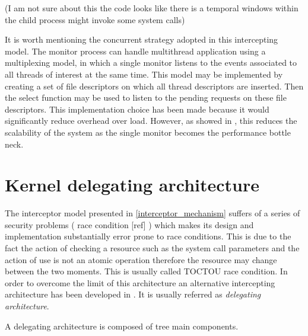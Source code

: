 (I am not sure about this the code looks like there is a temporal windows within the child process might invoke some system calls) 

It is worth mentioning the concurrent strategy adopted in this intercepting model. The monitor process can handle multithread application using a multiplexing model, in which a single monitor listens to the events associated to all threads of interest at the same time. This model may be implemented by creating a set of file descriptors on which all thread descriptors are inserted. Then the select function may be used to listen to the pending requests on these file descriptors.  This implementation choice has been made because it would  significantly reduce overhead over load. However, as showed in \cite{Garfinkel03ostia:a}, this reduces the scalability of the system as the single monitor becomes the performance bottle neck.  


\section{Kernel delegating  architecture}

The interceptor model presented in \ref{interceptor_mechanism} suffers of a series of security problems ( race condition [ref] ) which makes its design and implementation substantially error prone to race conditions. This is due to the fact the action of checking a resource such as the system call parameters and the action of use is not an atomic operation therefore the resource may change between the two moments. This is usually called TOCTOU race condition.  In order to overcome the limit of this architecture an alternative  intercepting architecture has been developed  in \cite{Garfinkel03ostia:a}. It is usually referred as \textit{delegating architecture}. 

A delegating architecture is composed of tree main components. 


